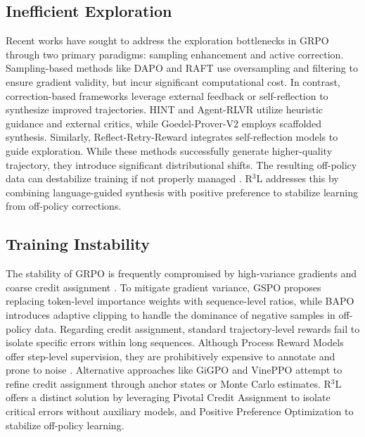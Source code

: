 \documentclass[11pt]{article}
\begin{document}
\subsection{Inefficient Exploration}
Recent works have sought to address the exploration bottlenecks in GRPO through two primary paradigms: sampling enhancement and active correction. Sampling-based methods like DAPO \cite{yu2025dapo} and RAFT \cite{dongraft} use oversampling and filtering to ensure gradient validity, but incur significant computational cost. In contrast, correction-based frameworks leverage external feedback or self-reflection to synthesize improved trajectories. HINT \cite{wang2025hint} and Agent-RLVR \cite{da2025agent} utilize heuristic guidance and external critics, while Goedel-Prover-V2 \cite{lin2025goedel} employs scaffolded synthesis. Similarly, Reflect-Retry-Reward \cite{bensal2025reflect} integrates self-reflection models to guide exploration. While these methods successfully generate higher-quality trajectory, they introduce significant distributional shifts. The resulting off-policy data can destabilize training if not properly managed \cite{zheng2025prosperity}. R$^3$L addresses this by combining language-guided synthesis with positive preference to stabilize learning from off-policy corrections.

\subsection{Training Instability}
The stability of GRPO is frequently compromised by high-variance gradients \cite{liu2025understanding} and coarse credit assignment \cite{parthasarathi2025grpo}. To mitigate gradient variance, GSPO \cite{zheng2025group} proposes replacing token-level importance weights with sequence-level ratios, while BAPO \cite{xi2025bapo} introduces adaptive clipping to handle the dominance of negative samples in off-policy data. Regarding credit assignment, standard trajectory-level rewards fail to isolate specific errors within long sequences. Although Process Reward Models \cite{wang2024math} offer step-level supervision, they are prohibitively expensive to annotate and prone to noise \cite{xiong2024watch}. Alternative approaches like GiGPO \cite{feng2025group} and VinePPO \cite{kazemnejad2024vineppo} attempt to refine credit assignment through anchor states or Monte Carlo estimates. R$^3$L offers a distinct solution by leveraging Pivotal Credit Assignment to isolate critical errors without auxiliary models, and Positive Preference Optimization to stabilize off-policy learning.
\end{document}
